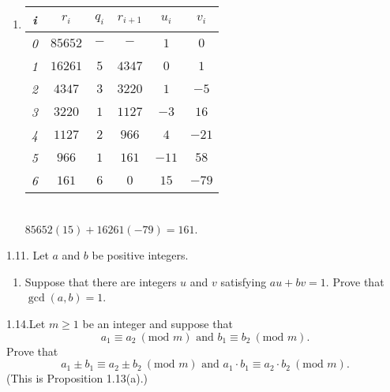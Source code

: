 {\begin{enumerate}
    \item 
    
    \begin{tabular}{c|c|c|c|c|c}
        \textit{i} & \textit{$r_i$} & \textit{$q_i$} & $r_{i + 1}$ & \textit{$u_i$} & \textit{$v_i$} \\ \hline
        \textit{0} & $85652$ & $-$ & $-$ & $1$ & $0$ \\ \hline
        \textit{1} & $16261$ & $5$ & $4347$ & $0$ & $1$ \\ \hline
        \textit{2} & $4347$ & $3$ & $3220$ & $1$ & $-5$ \\ \hline
        \textit{3} & $3220$ & $1$ & $1127$ & $-3$ & $16$ \\ \hline
        \textit{4} & $1127$ & $2$ & $966$ & $4$ & $-21$ \\ \hline
        \textit{5} & $966$ & $1$ & $161$ & $-11$ & $58$ \\ \hline
        \textit{6} & $161$ & $6$ & $0$ & $15$ & $-79$ \\
    \end{tabular} \\

    $85652(15) + 16261(-79) = 161$.    
\end{enumerate}
}

\begin{exercise}
    {1.11.} Let $a$ and $b$ be positive integers.
    \begin{enumerate}
        \item Suppose that there are integers $u$ and $v$ satisfying $au + bv = 1$. Prove that $\gcd(a, b) = 1$.
    \end{enumerate}
\end{exercise}


\begin{exercise}
    {1.14.}Let $m \geq 1$ be an integer and suppose that $$a_1 \equiv a_2 \ (\text{mod } m) \text{ and } b_1 \equiv b_2 \ (\text{mod } m).$$ Prove that $$a_1 \pm b_1 \equiv a_2 \pm b_2 \ (\text{mod } m) \text{ and } a_1 \cdot b_1 \equiv a_2 \cdot b_2 \ (\text{mod } m).$$ (This is Proposition 1.13(a).)
\end{exercise}


